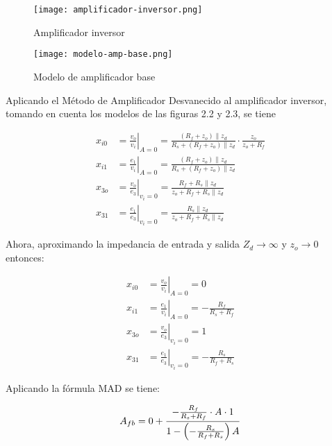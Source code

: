 \begin{figure}[ht]
    \centering
    \texttt{[image: amplificador-inversor.png]}
    \caption{Amplificador inversor}
    \label{fig:mt-amplificador-inversor}
\end{figure}

\begin{figure}[ht]
    \centering
    \texttt{[image: modelo-amp-base.png]}
    \caption{Modelo de amplificador base}
    \label{fig:mt-modelo-amp-base}
\end{figure}


Aplicando el Método de Amplificador Desvanecido al amplificador inversor, tomando en cuenta los modelos de las figuras 2.2 y 2.3, se tiene

\begin{align*}
    x_{i0} &= \left. \frac{v_o}{v_i} \right|_{A=0} = \frac{(R_f + z_o) \parallel z_d}{R_s + (R_f + z_o) \parallel z_d} \cdot \frac{z_o}{z_o + R_f} \\
    x_{i1} &= \left. \frac{e_1}{v_i} \right|_{A=0} = \frac{(R_f + z_o) \parallel z_d}{R_s + (R_f + z_o) \parallel z_d} \\
    x_{3o} &= \left. \frac{v_o}{e_3} \right|_{v_i=0} = \frac{R_f + R_s \parallel z_d}{z_o + R_f + R_s \parallel z_d} \\
    x_{31} &= \left. \frac{e_1}{e_3} \right|_{v_i=0} = \frac{R_s \parallel z_d}{z_o + R_f + R_s \parallel z_d}
\end{align*}

Ahora, aproximando la impedancia de entrada y salida $Z_d \rightarrow \infty $ y $z_o \rightarrow 0$ entonces:

\begin{align*}
x_{i0} &= \left. \frac{v_o}{v_i} \right|_{A=0} = 0 \\
x_{i1} &= \left. \frac{e_1}{v_i} \right|_{A=0} = -\frac{R_f}{R_s + R_f} \\
x_{3o} &= \left. \frac{v_o}{e_3} \right|_{v_i=0} = 1 \\
x_{31} &= \left. \frac{e_1}{e_3} \right|_{v_i=0} = -\frac{R_s}{R_f + R_s}
\end{align*}

Aplicando la fórmula MAD se tiene: 

\begin{equation*}
A_{fb} = 0 + \frac{-\frac{R_f}{R_s + R_f} \cdot A \cdot 1}{1 - \left( -\frac{R_s}{R_f + R_s} \right) A} \\
\end{equation*}

